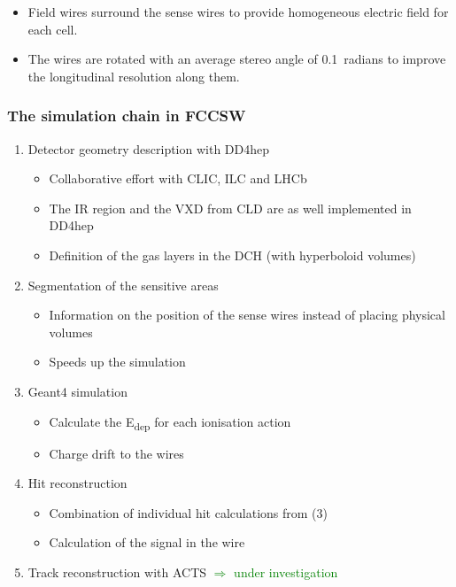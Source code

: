 \documentclass[aspectratio=169, hyperref={colorlinks=true,pdfpagelabels=false,linkcolor=black}, xcolor=dvipsnames,10pt]{beamer}
\begin{document}
\begin{frame}
  \begin{itemize}
    \item Field wires surround the sense wires to provide homogeneous electric field for each cell.
    \item The wires are rotated with an average stereo angle of 0.1~radians to improve the longitudinal resolution along them.
  \end{itemize}


\end{frame}


\begin{frame}
  \frametitle{The simulation chain in FCCSW}

  \begin{enumerate}
  	\item Detector geometry description with DD4hep
  		\begin{itemize}
  		\item Collaborative effort with CLIC, ILC and LHCb
  		\item The IR region and the VXD from CLD are as well implemented in DD4hep
  		\item Definition of the gas layers in the DCH (with hyperboloid volumes)
  		\end{itemize}
  	\item Segmentation of the sensitive areas
  		\begin{itemize}
  		\item Information on the position of the sense wires instead of placing physical volumes
  		\item Speeds up the simulation
  		\end{itemize}
  	\item Geant4 simulation
  		\begin{itemize}
  		\item Calculate the E\textsubscript{dep} for each ionisation action
  		\item Charge drift to the wires
  		\end{itemize}
  	\item Hit reconstruction
  		\begin{itemize}
  		\item Combination of individual hit calculations from (3)
  		\item Calculation of the signal in the wire
  		\end{itemize}
    \item Track reconstruction with ACTS \textcolor{Green}{$\Rightarrow$ under investigation}
	\end{enumerate}


\end{frame}
\end{document}
